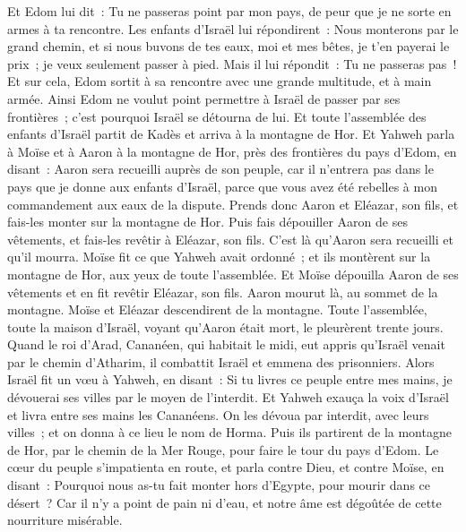 \begin{multicols}{2}
Et Edom lui dit~: Tu ne passeras point par mon pays, de peur que je ne sorte en armes à ta rencontre.
Les enfants d'Israël lui répondirent~: Nous monterons par le grand chemin, et si nous buvons de tes eaux, moi et mes bêtes, je t'en payerai le prix~; je veux seulement passer à pied.
Mais il lui répondit~: Tu ne passeras pas~! Et sur cela, Edom sortit à sa rencontre avec une grande multitude, et à main armée.
Ainsi Edom ne voulut point permettre à Israël de passer par ses frontières~; c'est pourquoi Israël se détourna de lui.
Et toute l'assemblée des enfants d'Israël partit de Kadès et arriva à la montagne de Hor.
Et Yahweh parla à Moïse et à Aaron à la montagne de Hor, près des frontières du pays d'Edom, en disant~:
Aaron sera recueilli auprès de son peuple, car il n'entrera pas dans le pays que je donne aux enfants d'Israël, parce que vous avez été rebelles à mon commandement aux eaux de la dispute.
Prends donc Aaron et Eléazar, son fils, et fais-les monter sur la montagne de Hor.
Puis fais dépouiller Aaron de ses vêtements, et fais-les revêtir à Eléazar, son fils. C'est là qu'Aaron sera recueilli et qu'il mourra.
Moïse fit ce que Yahweh avait ordonné~; et ils montèrent sur la montagne de Hor, aux yeux de toute l'assemblée.
Et Moïse dépouilla Aaron de ses vêtements et en fit revêtir Eléazar, son fils. Aaron mourut là, au sommet de la montagne. Moïse et Eléazar descendirent de la montagne.
Toute l'assemblée, toute la maison d'Israël, voyant qu'Aaron était mort, le pleurèrent trente jours.
\VerseOne{}Quand le roi d'Arad, Cananéen, qui habitait le midi, eut appris qu'Israël venait par le chemin d'Atharim, il combattit Israël et emmena des prisonniers.
Alors Israël fit un vœu à Yahweh, en disant~: Si tu livres ce peuple entre mes mains, je dévouerai ses villes par le moyen de l'interdit.
Et Yahweh exauça la voix d'Israël et livra entre ses mains les Cananéens. On les dévoua par interdit, avec leurs villes~; et on donna à ce lieu le nom de Horma.
Puis ils partirent de la montagne de Hor, par le chemin de la Mer Rouge, pour faire le tour du pays d'Edom. Le cœur du peuple s'impatienta en route,
et parla contre Dieu, et contre Moïse, en disant~: Pourquoi nous as-tu fait monter hors d'Egypte, pour mourir dans ce désert~? Car il n'y a point de pain ni d'eau, et notre âme est dégoûtée de cette nourriture misérable.

\end{multicols}
